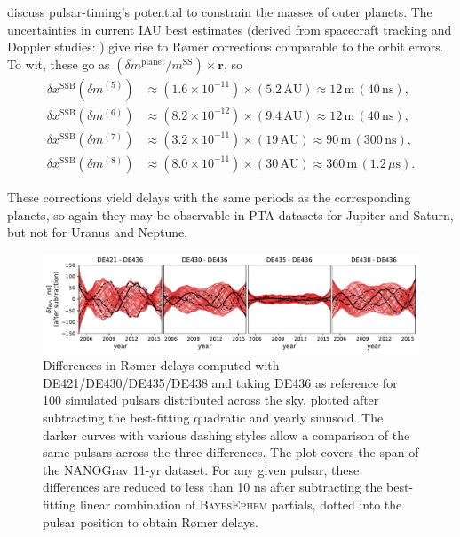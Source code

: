 \documentclass[iop,apj,twocolappendix]{emulateapj}
\begin{document}
\citet{2010ApJ...720L.201C} discuss pulsar-timing's potential to constrain the masses of outer planets. The uncertainties in current IAU best estimates (derived from spacecraft tracking and Doppler studies: \citealt{iaumasses,jh+2000,2006AJ....132.2520J,2014AJ....148...76J,2009AJ....137.4322J}) give rise to R{\o}mer corrections comparable to the orbit errors. To wit, these go as $(\delta m^\mathrm{planet}/m^\mathrm{SS}) \times \mathbf{r}$, so
%
\begin{equation}
    \begin{aligned}
    \delta x^\mathrm{SSB}(\delta m^{(5)}) & \approx (1.6 \!\times\! 10^{-11})\!\times\!
    (5.2 \, \mathrm{AU})
    \approx 12 \, \mathrm{m} \, (40 \, \mathrm{ns}), \\
    \delta x^\mathrm{SSB}(\delta m^{(6)}) & \approx (8.2 \!\times\! 10^{-12}) \!\times\!
    (9.4 \, \mathrm{AU})
    \approx 12 \, \mathrm{m} \, (40 \, \mathrm{ns}), \\
    \delta x^\mathrm{SSB}(\delta m^{(7)}) & \approx (3.2 \!\times\! 10^{-11}) \!\times\!
    (19 \, \mathrm{AU})
    \approx 90 \, \mathrm{m} \, (300 \, \mathrm{ns}), \\
    \delta x^\mathrm{SSB}(\delta m^{(8)}) & \approx (8.0 \!\times\! 10^{-11}) \!\times\!
    (30 \, \mathrm{AU})
    \approx 360 \, \mathrm{m} \,
    (1.2 \, \mu\mathrm{s}).
    \end{aligned}
\end{equation}

These corrections yield delays with the same periods as the corresponding planets, so again they may be observable in PTA datasets for Jupiter and Saturn, but not for Uranus and Neptune.
%
\begin{figure}[t]
    \centering
    \includegraphics[width=2\columnwidth]{figures/roemerdiff.pdf}
    \caption{Differences in R{\o}mer delays computed with DE421/DE430/DE435/DE438 and taking DE436 as reference for 100 simulated pulsars distributed across the sky, plotted after subtracting the best-fitting quadratic and yearly sinusoid. The darker curves with various dashing styles allow a comparison of the same pulsars across the three differences. The plot covers the span of the NANOGrav 11-yr dataset.
    For any given pulsar, these differences are reduced to less than 10 ns after subtracting the best-fitting linear combination of \textsc{BayesEphem} partials, dotted into the pulsar position to obtain R{\o}mer delays.
    }
    \label{fig:Roemer}
\end{figure}
\end{document}

